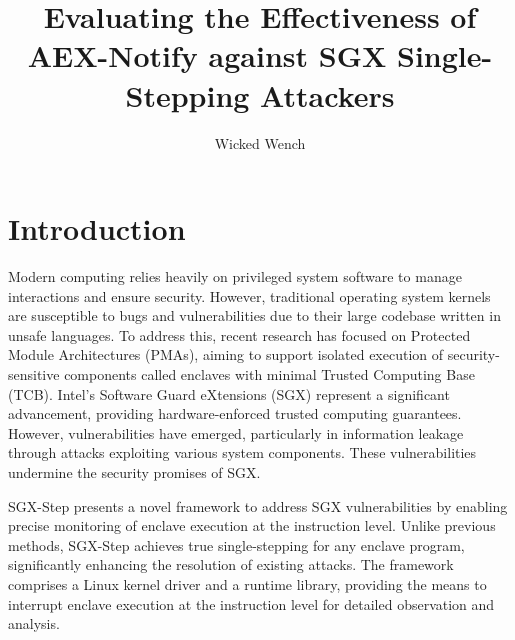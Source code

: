 \documentclass{llncs}
\title{Evaluating the Effectiveness of AEX-Notify against SGX Single-Stepping Attackers}
\author{Wicked Wench}
\institute{	University of L\"ubeck, Germany}
\begin{document}
\maketitle

%


\section{Introduction}


Modern computing relies heavily on privileged system software to manage
interactions and ensure security. However, traditional operating system kernels
are susceptible to bugs and vulnerabilities due to their large codebase written
in unsafe languages. To address this, recent research has focused on Protected
Module Architectures (PMAs), aiming to support isolated execution of
security-sensitive components called enclaves with minimal Trusted Computing
Base (TCB). Intel’s Software Guard eXtensions (SGX)
\cite{Intel16,Intel17} represent a significant advancement, providing
hardware-enforced trusted computing guarantees. However, vulnerabilities have
emerged, particularly in information leakage through attacks exploiting various
system components. These vulnerabilities undermine the security promises of
SGX.

SGX-Step presents a novel framework to address SGX vulnerabilities by enabling
precise monitoring of enclave execution at the instruction level. Unlike
previous methods, SGX-Step achieves true single-stepping for any enclave
program, significantly enhancing the resolution of existing attacks. The
framework comprises a Linux kernel driver and a runtime library, providing the
means to interrupt enclave execution at the instruction level for detailed
observation and analysis.
\end{document}
